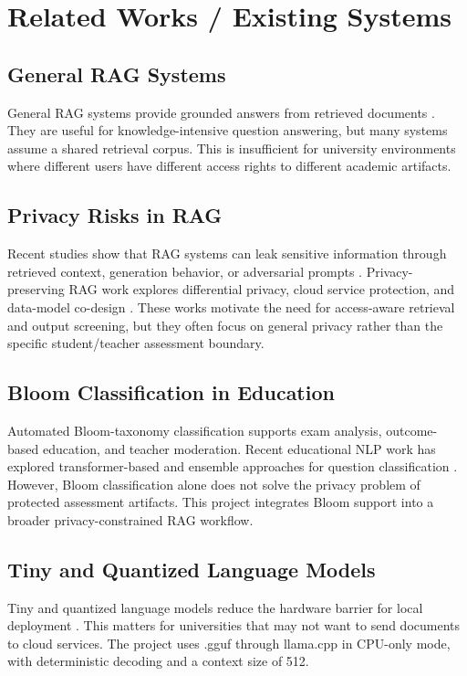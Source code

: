 \section{Related Works / Existing Systems}

\subsection{General RAG Systems}
General RAG systems provide grounded answers from retrieved documents \cite{lewis2020rag}. They are useful for knowledge-intensive question answering, but many systems assume a shared retrieval corpus. This is insufficient for university environments where different users have different access rights to different academic artifacts.

\subsection{Privacy Risks in RAG}
Recent studies show that RAG systems can leak sensitive information through retrieved context, generation behavior, or adversarial prompts \cite{zeng2024goodbad,zhang2025beyondtext}. Privacy-preserving RAG work explores differential privacy, cloud service protection, and data-model co-design \cite{koga2024dprag,cheng2024remoterag,fu2026ppeduvec}. These works motivate the need for access-aware retrieval and output screening, but they often focus on general privacy rather than the specific student/teacher assessment boundary.

\subsection{Bloom Classification in Education}
Automated Bloom-taxonomy classification supports exam analysis, outcome-based education, and teacher moderation. Recent educational NLP work has explored transformer-based and ensemble approaches for question classification \cite{hamid2026bloom}. However, Bloom classification alone does not solve the privacy problem of protected assessment artifacts. This project integrates Bloom support into a broader privacy-constrained RAG workflow.

\subsection{Tiny and Quantized Language Models}
Tiny and quantized language models reduce the hardware barrier for local deployment \cite{zhang2024tinyllama,dettmers2023qlora,lin2023awq}. This matters for universities that may not want to send documents to cloud services. The project uses \qwenmodel{}.gguf through llama.cpp in CPU-only mode, with deterministic decoding and a context size of 512.

